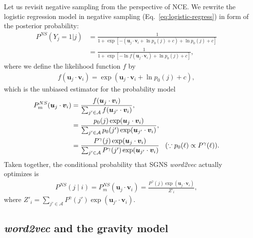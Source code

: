 \documentclass[12pt,a4paper]{article}
\newcommand{\vect}[1]{\boldsymbol{#1}}
\def\given{\mid}
\begin{document}
Let us revisit negative sampling from the perspective of NCE.
We rewrite the logistic regression model in negative sampling (Eq.~\eqref{eq:logistic-regress}) in form of the posterior probability:
\begin{align}
	P^{NS}\left(Y_{j}=1 \vert j\right) & = \frac{
		1
	}{
		1 + \exp\left[ - \left( \vect{u}_j \cdot \vect{v}_{i} + \ln p_0(j) + c \right) + \ln p_0(j) + c \right]
	}                                             \\
	                                   & = \frac{
		1
	}{
		1 + \exp\left[ - \ln f(\vect{u}_j \cdot \vect{v}_{i}) + \ln p_0(j) + c \right]
	},
\end{align}
where we define the likelihood function $f$ by
\begin{align}
	f(\vect{u}_j \cdot \vect{v}_{i}) = \exp\left( \vect{u}_j \cdot \vect{v}_{i} + \ln p_0(j) + c\right),
\end{align}
which is the unbiased estimator for the probability model
\begin{align}
	\label{eq:unbiasef}
	P_m^{NS}(\vect{u}_j \cdot \vect{v}_{i}) & = \frac{ f(\vect{u}_j \cdot \vect{v}_{i}) }{\sum_{ j' \in {\cal A}} f(\vect{u}_{j'} \cdot \vect{v}_{i}) },                                                                                               \\
	                                        & = \frac{  p_0(j)\exp( \vect{u}_j \cdot \vect{v}_{i} ) }{\sum_{j' \in \mathcal{A}}  p_0(j') \exp(\vect{u}_{j'} \cdot \vect{v}_{i})},                                                                      \\
	                                        & = \frac{  P^\gamma(j)\exp( \vect{u}_j \cdot \vect{v}_{i} ) }{\sum_{j' \in \mathcal{A}}  P^\gamma(j') \exp(\vect{u}_{j'} \cdot \vect{v}_{i})} \hspace{0.3cm}(\because p_0(\ell) \propto P^\gamma (\ell)).
\end{align}
Taken together, the conditional probability that SGNS \textit{word2vec} actually optimizes is
\begin{align}
	P^{NS}(j\given i) = P_m^{NS}(\vect{u}_j \cdot \vect{v}_{i})  =  \frac{  P^\gamma(j)\exp( \vect{u}_j \cdot \vect{v}_{i} ) }{Z'_i},
\end{align}
where $Z'_i=\sum_{j' \in \mathcal{A}}  P^\gamma(j') \exp(\vect{u}_{j'} \cdot \vect{v}_{i})$.

\subsection{\textit{word2vec} and the gravity model}
\end{document}
